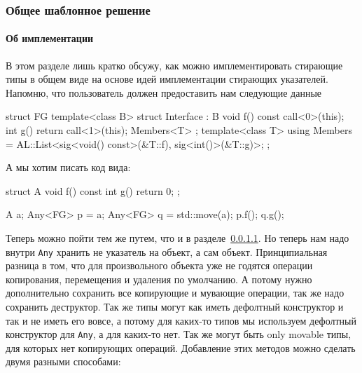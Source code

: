 \subsubsection{Общее шаблонное решение}

\paragraph{Об имплементации}

В этом разделе лишь кратко обсужу, как можно имплементировать стирающие типы в общем виде на основе идей имплементации стирающих указателей.
Напомню, что пользователь должен предоставить нам следующие данные
\begin{cppcode}
struct FG {
  template<class B>
  struct Interface : B {
    void f() const {
      call<0>(this);
    }
    int g() {
      return call<1>(this); Members<T>
    }
  };
  template<class T>
  using Members = AL::List<sig<void() const>(&T::f), sig<int()>(&T::g)>;
};
\end{cppcode}
А мы хотим писать код вида:
\begin{cppcode}
struct A {
  void f() const {}
  int g() { return 0; }
};

A a;
Any<FG> p = a;
Any<FG> q = std::move(a);
p.f();
q.g();
\end{cppcode}
Теперь можно пойти тем же путем, что и в разделе~\ref{}.
Но теперь нам надо внутри \verb"Any" хранить не указатель на объект, а сам объект.
Принципиальная разница в том, что для произвольного объекта уже не годятся операции копирования, перемещения и удаления по умолчанию.
А потому нужно дополнительно сохранить все копирующие и мувающие операции, так же надо сохранить деструктор.
Так же типы могут как иметь дефолтный конструктор и так и не иметь его вовсе, а потому для каких-то типов мы используем дефолтный конструктор для \verb"Any", а для каких-то нет.
Так же могут быть only movable типы, для которых нет копирующих операций.
Добавление этих методов можно сделать двумя разными способами:
